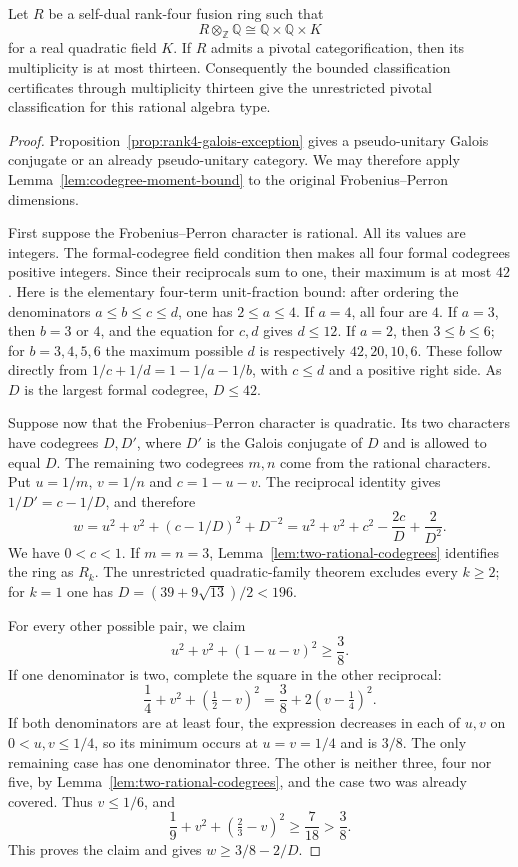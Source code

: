 \begin{theorem}\label{thm:quadratic-character-bound}
Let $R$ be a self-dual rank-four fusion ring such that
\[
 R\otimes_{\mathbb Z}\mathbb Q\cong\mathbb Q\times\mathbb Q\times K
\]
for a real quadratic field $K$. If $R$ admits a pivotal categorification,
then its multiplicity is at most thirteen. Consequently the bounded classification certificates through
multiplicity thirteen give the unrestricted pivotal classification
for this rational algebra type.
\end{theorem}
\begin{proof}
Proposition~\ref{prop:rank4-galois-exception} gives a pseudo-unitary Galois
conjugate or an already pseudo-unitary category. We may therefore apply
Lemma~\ref{lem:codegree-moment-bound} to the original Frobenius--Perron
dimensions.

First suppose the Frobenius--Perron character is rational. All its
values are integers. The formal-codegree field condition then makes all
four formal codegrees positive integers. Since their reciprocals sum to
one, their maximum is at most $42$. Here is the elementary four-term
unit-fraction bound: after ordering the denominators $a\leq b\leq c\leq d$,
one has $2\leq a\leq4$. If $a=4$, all four are $4$. If $a=3$,
then $b=3$ or $4$, and the equation for $c,d$ gives $d\leq12$.
If $a=2$, then $3\leq b\leq6$; for $b=3,4,5,6$ the maximum possible
$d$ is respectively $42,20,10,6$. These follow directly from
$1/c+1/d=1-1/a-1/b$, with $c\leq d$ and a positive right side.
As $D$ is the largest formal codegree, $D\leq42$.

Suppose now that the Frobenius--Perron character is quadratic. Its two
characters have codegrees $D,D'$, where $D'$ is the Galois conjugate
of $D$ and is allowed to equal $D$. The
remaining two codegrees $m,n$ come
from the rational characters. Put $u=1/m$, $v=1/n$ and $c=1-u-v$.
The reciprocal identity gives $1/D'=c-1/D$, and therefore
\[
 w=u^2+v^2+(c-1/D)^2+D^{-2}
   =u^2+v^2+c^2-\frac{2c}{D}+\frac2{D^2}.
\]
We have $0<c<1$. If $m=n=3$, Lemma~\ref{lem:two-rational-codegrees}
identifies the ring as $R_k$. The unrestricted quadratic-family theorem
excludes every $k\geq2$; for $k=1$ one has
$D=(39+9\sqrt{13})/2<196$.

For every other possible pair, we claim
\[
 u^2+v^2+(1-u-v)^2\geq\frac38.
\]
If one denominator is two, complete the square in the other reciprocal:
\[
 \frac14+v^2+(\tfrac12-v)^2
 =\frac38+2(v-\tfrac14)^2.
\]
If both denominators are at least four, the expression decreases in each
of $u,v$ on $0<u,v\leq1/4$, so its minimum occurs at $u=v=1/4$ and is
$3/8$. The only remaining case has one denominator three. The other is
neither three, four nor five, by Lemma~\ref{lem:two-rational-codegrees},
and the case two was already covered. Thus $v\leq1/6$, and
\[
 \frac19+v^2+(\tfrac23-v)^2\geq\frac7{18}>\frac38.
\]
This proves the claim and gives $w\geq3/8-2/D$.


\end{proof}
